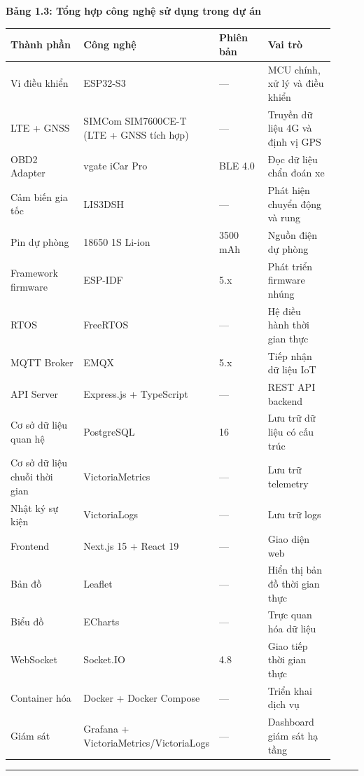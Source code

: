 \documentclass[13pt,a4paper]{extarticle}
\newcounter{none} %
\newcommand{\thesislongtableorignewline}{}
\let\thesislongtableorignewline\\
\renewcommand{\\}{\thesislongtableorignewline\hline}%
\let\\\thesislongtableorignewline
\newcommand{\thesistabletitle}[1]{%
  \begin{center}\textbf{#1}\end{center}%
}
\begin{document}
\thesistabletitle{Bảng 1.3: Tổng hợp công nghệ sử dụng trong dự án}

{\def\LTcaptype{none} %
\begin{longtable}{|p{0.30\linewidth}|p{0.16\linewidth}|p{0.20\linewidth}|p{0.26\linewidth}|}
\hline \textbf{Thành phần} & \textbf{Công nghệ} & \textbf{Phiên bản} & \textbf{Vai trò} \\
\hline
\endhead
\hline
\endlastfoot
Vi điều khiển & ESP32-S3 & --- & MCU chính, xử lý và điều khiển \\\hline
LTE + GNSS & SIMCom SIM7600CE-T (LTE + GNSS tích hợp) & --- & Truyền dữ
liệu 4G và định vị GPS \\\hline
OBD2 Adapter & vgate iCar Pro & BLE 4.0 & Đọc dữ liệu chẩn đoán xe \\\hline
Cảm biến gia tốc & LIS3DSH & --- & Phát hiện chuyển động và rung \\\hline
Pin dự phòng & 18650 1S Li-ion & 3500 mAh & Nguồn điện dự phòng \\\hline
Framework firmware & ESP-IDF & 5.x & Phát triển firmware nhúng \\\hline
RTOS & FreeRTOS & --- & Hệ điều hành thời gian thực \\\hline
MQTT Broker & EMQX & 5.x & Tiếp nhận dữ liệu IoT \\\hline
API Server & Express.js + TypeScript & --- & REST API backend \\\hline
Cơ sở dữ liệu quan hệ & PostgreSQL & 16 & Lưu trữ dữ liệu có cấu trúc \\\hline
Cơ sở dữ liệu chuỗi thời gian & VictoriaMetrics & --- & Lưu trữ
telemetry \\\hline
Nhật ký sự kiện & VictoriaLogs & --- & Lưu trữ logs \\\hline
Frontend & Next.js 15 + React 19 & --- & Giao diện web \\\hline
Bản đồ & Leaflet & --- & Hiển thị bản đồ thời gian thực \\\hline
Biểu đồ & ECharts & --- & Trực quan hóa dữ liệu \\\hline
WebSocket & Socket.IO & 4.8 & Giao tiếp thời gian thực \\\hline
Container hóa & Docker + Docker Compose & --- & Triển khai dịch vụ \\\hline
Giám sát & Grafana + VictoriaMetrics/VictoriaLogs & --- & Dashboard giám
sát hạ tầng \\\hline
\end{longtable}
}

\begin{center}\rule{0.5\linewidth}{0.5pt}\end{center}
\end{document}

